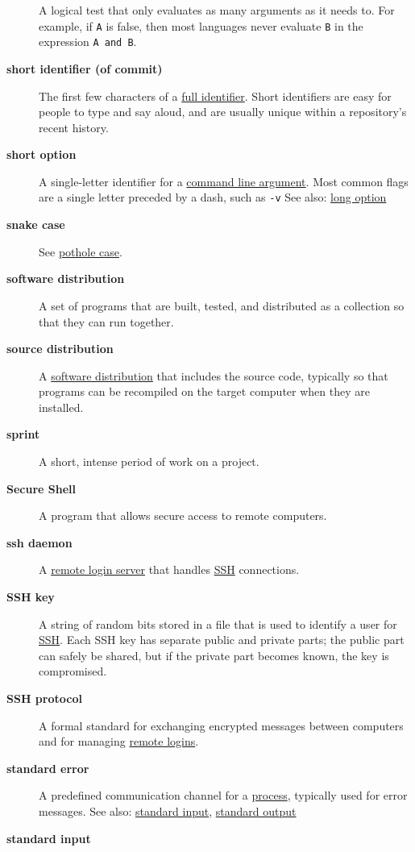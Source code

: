 \documentclass[
]{krantz}
\begin{document}
\begin{description}
A logical test that only evaluates as many arguments as it needs to. For example, if \texttt{A} is false, then most languages never evaluate \texttt{B} in the expression \texttt{A\ and\ B}.
\item[\textbf{short identifier (of commit)}]
The first few characters of a \protect\hyperlink{full_identifier_git}{full identifier}. Short identifiers are easy for people to type and say aloud, and are usually unique within a repository's recent history.
\item[\textbf{short option}]
A single-letter identifier for a \protect\hyperlink{command_line_argument}{command line argument}. Most common flags are a single letter preceded by a dash, such as \texttt{-v} See also: \protect\hyperlink{long_option}{long option}
\item[\textbf{snake case}]
See \protect\hyperlink{pothole_case}{pothole case}.
\item[\textbf{software distribution}]
A set of programs that are built, tested, and distributed as a collection so that they can run together.
\item[\textbf{source distribution}]
A \protect\hyperlink{software_distribution}{software distribution} that includes the source code, typically so that programs can be recompiled on the target computer when they are installed.
\item[\textbf{sprint}]
A short, intense period of work on a project.
\item[\textbf{Secure Shell}]
A program that allows secure access to remote computers.
\item[\textbf{ssh daemon}]
A \protect\hyperlink{remote_login_server}{remote login server} that handles \protect\hyperlink{ssh}{SSH} connections.
\item[\textbf{SSH key}]
A string of random bits stored in a file that is used to identify a user for \protect\hyperlink{ssh}{SSH}. Each SSH key has separate public and private parts; the public part can safely be shared, but if the private part becomes known, the key is compromised.
\item[\textbf{SSH protocol}]
A formal standard for exchanging encrypted messages between computers and for managing \protect\hyperlink{remote_login_server}{remote logins}.
\item[\textbf{standard error}]
A predefined communication channel for a \protect\hyperlink{process}{process}, typically used for error messages. See also: \protect\hyperlink{stdin}{standard input}, \protect\hyperlink{stdout}{standard output}
\item[\textbf{standard input}]

\end{description}
\end{document}
